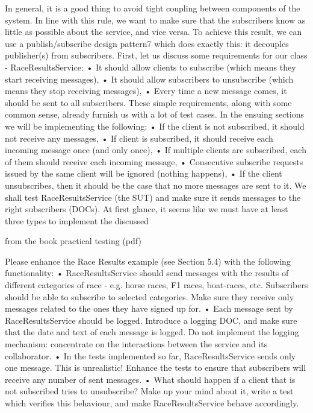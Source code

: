  In general, it is a good thing to avoid tight coupling between components of the system. In line with
this rule, we want to make sure that the subscribers know as little as possible about the service, and vice
versa. To achieve this result, we can use a publish/subscribe design pattern7 which does exactly this: it
decouples publisher(s) from subscribers.
First, let us discuss some requirements for our class - RaceResultsService:
• It should allow clients to subscribe (which means they start receiving messages),
• It should allow subscribers to unsubscribe (which means they stop receiving messages),
• Every time a new message comes, it should be sent to all subscribers.
These simple requirements, along with some common sense, already furnish us with a lot of test cases.
In the ensuing sections we will be implementing the following:
• If the client is not subscribed, it should not receive any messages,
• If client is subscribed, it should receive each incoming message once (and only once),
• If multiple clients are subscribed, each of them should receive each incoming message,
• Consecutive subscribe requests issued by the same client will be ignored (nothing happens),
• If the client unsubscribes, then it should be the case that no more messages are sent to it.
We shall test RaceResultsService (the SUT) and make sure it sends messages to the right subscribers
(DOCs). At first glance, it seems like we must have at least three types to implement the discussed

from the book  practical testing (pdf)

Please enhance the Race Results example (see Section 5.4) with the following functionality:
• RaceResultsService should send messages with the results of different categories of race - e.g. horse
races, F1 races, boat-races, etc. Subscribers should be able to subscribe to selected categories. Make
sure they receive only messages related to the ones they have signed up for.
• Each message sent by RaceResultsService should be logged. Introduce a logging DOC, and make
sure that the date and text of each message is logged. Do not implement the logging mechanism:
concentrate on the interactions between the service and its collaborator.
• In the tests implemented so far, RaceResultsService sends only one message. This is unrealistic!
Enhance the tests to ensure that subscribers will receive any number of sent messages.
• What should happen if a client that is not subscribed tries to unsubscribe? Make up your mind about
it, write a test which verifies this behaviour, and make RaceResultsService behave accordingly.
 

